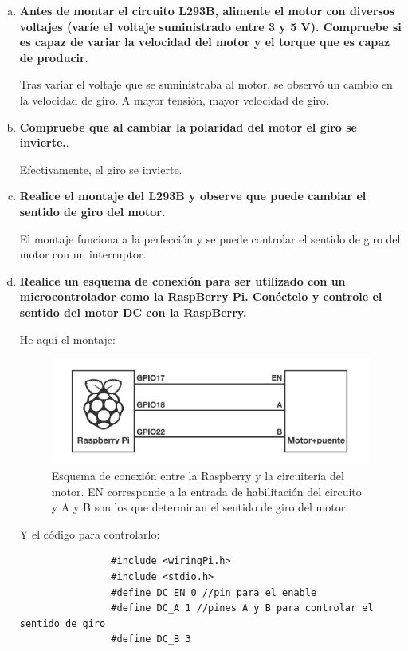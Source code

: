 \documentclass[11pt, a4paper]{article}
\begin{document}
		\begin{enumerate}[(a)]
			\item \textbf{Antes de montar el circuito L293B, alimente el motor con diversos voltajes (varíe el voltaje suministrado entre 3 y 5 V). Compruebe si es capaz de variar la velocidad del motor y el torque que es capaz de producir}.
			
			Tras variar el voltaje que se suministraba al motor, se observó un cambio en la velocidad de giro. A mayor tensión, mayor velocidad de giro.
			\item \textbf{Compruebe que al cambiar la polaridad del motor el giro se invierte.}.
			
			Efectivamente, el giro se invierte.
			\item \textbf{Realice el montaje del L293B y observe que puede cambiar el sentido de giro del motor.}
	
			El montaje funciona a la perfección y se puede controlar el sentido de giro del motor con un interruptor.
			
			\item \textbf{Realice un esquema de conexión para ser utilizado con un microcontrolador como la RaspBerry Pi. Conéctelo y controle el sentido del motor DC con la RaspBerry.}
			
			He aquí el montaje:
			
			\begin{figure}[h]
				\begin{center}
					\includegraphics[width=.9\textwidth]{dcmon}
					\caption*{Esquema de conexión entre la Raspberry y la circuitería del motor. EN corresponde a la entrada de habilitación del circuito y A y B son los que determinan el sentido de giro del motor.}
				\end{center}
			\end{figure}
			
			Y el código para controlarlo:
			\begin{verbatim}
				#include <wiringPi.h>
				#include <stdio.h>
				#define DC_EN 0 //pin para el enable
				#define DC_A 1 //pines A y B para controlar el sentido de giro
				#define DC_B 3
				

\end{verbatim}
\end{enumerate}
\end{document}
